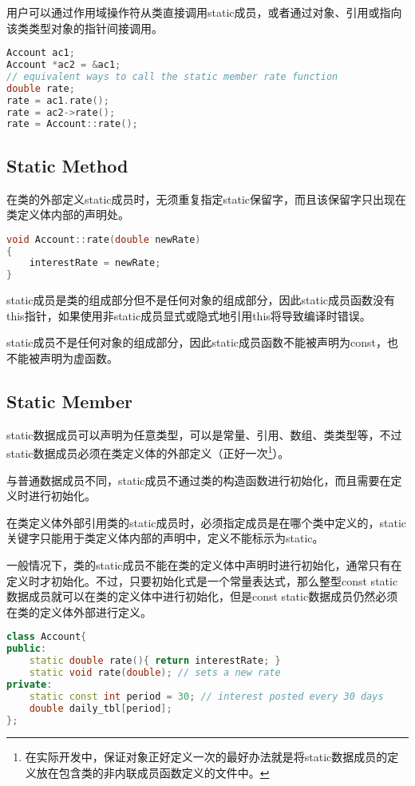 用户可以通过作用域操作符从类直接调用static成员，或者通过对象、引用或指向该类类型对象的指针间接调用。

\begin{lstlisting}[language=C++]
Account ac1;
Account *ac2 = &ac1;
// equivalent ways to call the static member rate function
double rate;
rate = ac1.rate();
rate = ac2->rate();
rate = Account::rate();
\end{lstlisting}

\subsection{Static Method}

在类的外部定义static成员时，无须重复指定static保留字，而且该保留字只出现在类定义体内部的声明处。

\begin{lstlisting}[language=C++]
void Account::rate(double newRate)
{
	interestRate = newRate;
}
\end{lstlisting}

static成员是类的组成部分但不是任何对象的组成部分，因此static成员函数没有this指针，如果使用非static成员显式或隐式地引用this将导致编译时错误。

static成员不是任何对象的组成部分，因此static成员函数不能被声明为const，也不能被声明为虚函数。

\subsection{Static Member}

static数据成员可以声明为任意类型，可以是常量、引用、数组、类类型等，不过static数据成员必须在类定义体的外部定义（正好一次\footnote{在实际开发中，保证对象正好定义一次的最好办法就是将static数据成员的定义放在包含类的非内联成员函数定义的文件中。}）。

与普通数据成员不同，static成员不通过类的构造函数进行初始化，而且需要在定义时进行初始化。

在类定义体外部引用类的static成员时，必须指定成员是在哪个类中定义的，static关键字只能用于类定义体内部的声明中，定义不能标示为static。

一般情况下，类的static成员不能在类的定义体中声明时进行初始化，通常只有在定义时才初始化。不过，只要初始化式是一个常量表达式，那么整型const static数据成员就可以在类的定义体中进行初始化，但是const static数据成员仍然必须在类的定义体外部进行定义。



\begin{lstlisting}[language=C++]
class Account{
public:
	static double rate(){ return interestRate; }
	static void rate(double); // sets a new rate
private:
	static const int period = 30; // interest posted every 30 days
	double daily_tbl[period];
};
\end{lstlisting}

